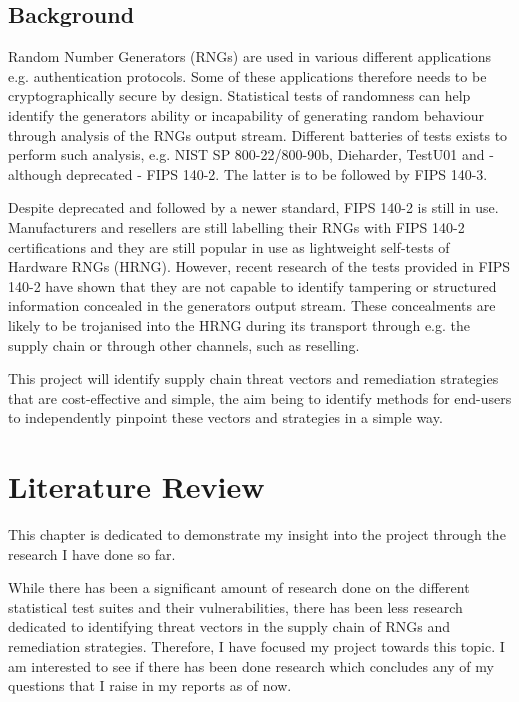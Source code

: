 \documentclass[]{final_report}
\begin{document}
\section*{Background}

\par{Random Number Generators (RNGs) are used in various different applications e.g. authentication protocols. Some of these applications therefore needs to be cryptographically secure by design. Statistical tests of randomness can help identify the generators ability or incapability of generating random behaviour through analysis of the RNGs output stream. Different batteries of tests exists to perform such analysis, e.g. NIST SP 800-22/800-90b, Dieharder, TestU01 and - although deprecated - FIPS 140-2. The latter is to be followed by FIPS 140-3.}

\par{Despite deprecated and followed by a newer standard, FIPS 140-2 is still in use. Manufacturers and resellers are still labelling their RNGs with FIPS 140-2 certifications and they are still popular in use as lightweight self-tests of Hardware RNGs (HRNG). However, recent research of the tests provided in FIPS 140-2 have shown that they are not capable to identify tampering or structured information concealed in the generators output stream. These concealments are likely to be trojanised into the HRNG during its transport through e.g. the supply chain or through other channels, such as reselling.}

\par{This project will identify supply chain threat vectors and remediation strategies that are cost-effective and simple, the aim being to identify methods for end-users to independently pinpoint these vectors and strategies in a simple way.}

\chapter*{Literature Review}

\par{This chapter is dedicated to demonstrate my insight into the project through the research I have done so far. }

\par{While there has been a significant amount of research done on the different statistical test suites and their vulnerabilities, there has been less research dedicated to identifying threat vectors in the supply chain of RNGs and remediation strategies. Therefore, I have focused my project towards this topic. I am interested to see if there has been done research which concludes any of my questions that I raise in my reports as of now.}
\end{document}
